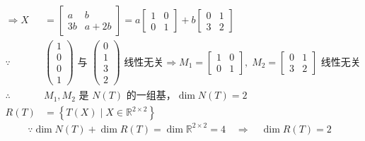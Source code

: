 \documentclass{article}
\begin{document}
\begin{align*}
\Rightarrow X &= \begin{bmatrix} a & b \\ 3b & a+2b \end{bmatrix}
= a\begin{bmatrix} 1 & 0 \\ 0 & 1 \end{bmatrix} + b\begin{bmatrix} 0 & 1 \\ 3 & 2 \end{bmatrix} \\
\because &
\begin{pmatrix} 1 \\ 0 \\ 0 \\ 1 \end{pmatrix}
\text{ 与 }
\begin{pmatrix} 0 \\ 1 \\ 3 \\ 2 \end{pmatrix}
\text{ 线性无关}
\Rightarrow M_1 = \begin{bmatrix} 1 & 0 \\ 0 & 1 \end{bmatrix},\;
M_2 = \begin{bmatrix} 0 & 1 \\ 3 & 2 \end{bmatrix}
\text{ 线性无关} \\
\therefore & M_1, M_2 \text{ 是 } N(T) \text{ 的一组基，} \dim N(T) = 2 \\
R(T) &= \left\{ T(X) \mid X \in \mathbb{R}^{2\times2} \right\}
\end{align*}
\[
\because \dim N(T) + \dim R(T) = \dim \mathbb{R}^{2\times2} = 4
\quad\Rightarrow\quad \dim R(T) = 2
\]
\end{document}
